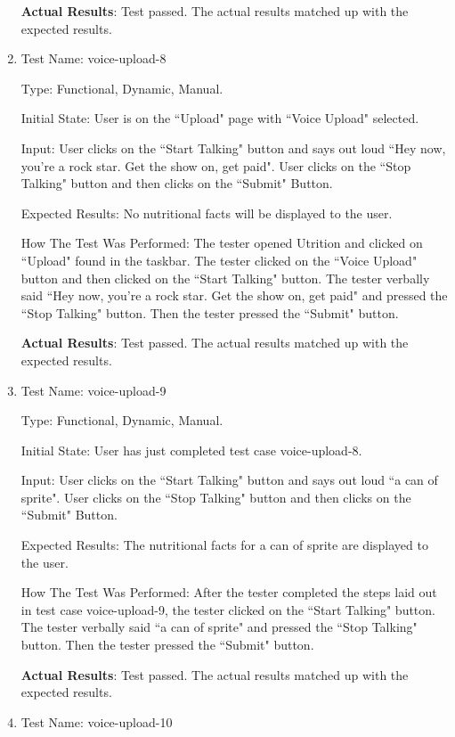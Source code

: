 \documentclass[12pt, titlepage]{article}
\begin{document}
\begin{enumerate}
		\textbf{Actual Results}: Test passed. The actual results matched up with the expected results.
		
		\item{Test Name: voice-upload-8}
		
		Type: Functional, Dynamic, Manual.
		
		Initial State: User is on the ``Upload" page with ``Voice Upload" selected.
		
		Input: User clicks on the ``Start Talking" button and says out loud ``Hey now, you're a rock star. Get the show on, get paid". User clicks on the ``Stop Talking" button and then clicks on the ``Submit" Button.
		
		Expected Results: No nutritional facts will be displayed to the user.
		
		How The Test Was Performed: The tester opened Utrition and clicked on ``Upload" found in the taskbar. The tester clicked on the ``Voice Upload" button and then clicked on the ``Start Talking" button. The tester verbally said ``Hey now, you're a rock star. Get the show on, get paid" and pressed the ``Stop Talking" button. Then the tester pressed the ``Submit" button.
		
		\textbf{Actual Results}: Test passed. The actual results matched up with the expected results.
		
		\item{Test Name: voice-upload-9}
		
		Type: Functional, Dynamic, Manual.
		
		Initial State: User has just completed test case voice-upload-8.
		
		Input: User clicks on the ``Start Talking" button and says out loud ``a can of sprite". User clicks on the ``Stop Talking" button and then clicks on the ``Submit" Button.
		
		Expected Results: The nutritional facts for a can of sprite are displayed to the user.
		
		How The Test Was Performed: After the tester completed the steps laid out in test case voice-upload-9, the tester clicked on the ``Start Talking" button. The tester verbally said ``a can of sprite" and pressed the ``Stop Talking" button. Then the tester pressed the ``Submit" button.
		
		\textbf{Actual Results}: Test passed. The actual results matched up with the expected results.
		
		\item{Test Name: voice-upload-10}
		

\end{enumerate}
\end{document}
